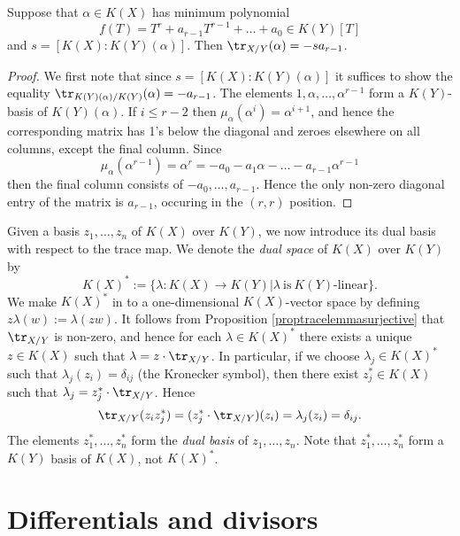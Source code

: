    \begin{lem} 
    Suppose that $\alpha \in K(X)$ has minimum polynomial 
        \[
        f(T) = T^r + a_{r-1}T^{r-1} + \ldots +a_0 \in K(Y)[T]
        \]
    and $s= [K(X):K(Y)(\alpha)]$.
    Then $\tr_{X/Y}(\alpha) = -sa_{r-1}$.
    \end{lem}
    \begin{proof}
    We first note that since $s = [K(X):K(Y)(\alpha)]$ it suffices to show the equality $\tr_{K(Y)(\alpha)/K(Y)}(\alpha) = -a_{r-1}$.
    The elements $1, \alpha, \ldots, \alpha^{r-1}$ form a $K(Y)$-basis of $K(Y)(\alpha)$.
    If $i \leq r-2$ then $\mu_{\alpha}(\alpha^i) = \alpha^{i+1}$, and hence the corresponding matrix has 1's below the diagonal and zeroes elsewhere on all columns, except the final column.
    Since 
        \[
        \mu_{\alpha}(\alpha^{r-1}) = \alpha^r = -a_0 - a_1\alpha - \ldots - a_{r-1}\alpha^{r-1}
        \]
    then the final column consists of $-a_0, \ldots, a_{r-1}$.
    Hence the only non-zero diagonal entry of the matrix is $a_{r-1}$, occuring in the $(r,r)$ position.
    \end{proof}

            
Given a basis $z_1,\ldots,z_n$ of $K(X)$ over $K(Y)$, we now introduce its dual basis with respect to the trace map.
We denote the {\em dual space} of $K(X)$ over $K(Y)$ by 
    \[
    K(X)^*:=\{\lambda \colon K(X) \rightarrow K(Y)| \lambda\ \text{is}\ K(Y)\text{-linear}\}.
    \]
We make $K(X)^*$ in to a one-dimensional $K(X)$-vector space by defining $z \lambda(w):=\lambda(z w)$.
It follows from Proposition \ref{proptracelemmasurjective} that $\tr_{X/Y}$ is non-zero, and hence for each $\lambda \in K(X)^*$ there exists a unique $z\in K(X)$ such that $\lambda = z\cdot \tr_{X/Y}$.
In particular, if we choose $\lambda_j\in K(X)^*$ such that $\lambda_j(z_i) = \delta_{ij}$ (the Kronecker symbol), then there exist $z_j^* \in K(X)$ such that $\lambda_j = z_j^*\cdot \tr_{X/Y}$.
Hence
    \[
    \tr_{X/Y}(z_iz_j^*) = (z_j^*\cdot \tr_{X/Y})(z_i) = \lambda_j(z_i) = \delta_{ij}.
    \]
The elements $z_1^*, \ldots , z_n^*$ form the {\em dual basis} of $z_1, \ldots , z_n$.
Note that $z_1^*, \ldots, z_n^*$ form a $K(Y)$ basis of $K(X)$, not $K(X)^*$.


\section{Differentials and divisors}

